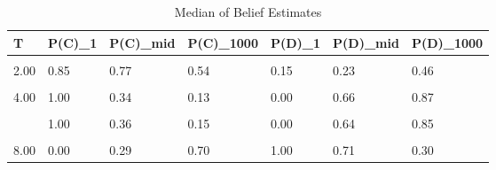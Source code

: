 \begin{table}[!h]
\centering
\caption{Median of Belief Estimates}
\centering
\begin{tabular}[t]{lllllll}
\toprule
T & P(C)\_1 & P(C)\_mid & P(C)\_1000 & P(D)\_1 & P(D)\_mid & P(D)\_1000\\
\midrule
\cellcolor{gray!10}{1.00} & \cellcolor{gray!10}{1.00} & \cellcolor{gray!10}{0.30} & \cellcolor{gray!10}{0.28} & \cellcolor{gray!10}{0.00} & \cellcolor{gray!10}{0.70} & \cellcolor{gray!10}{0.72}\\
2.00 & 0.85 & 0.77 & 0.54 & 0.15 & 0.23 & 0.46\\
\cellcolor{gray!10}{3.00} & \cellcolor{gray!10}{0.98} & \cellcolor{gray!10}{0.09} & \cellcolor{gray!10}{0.08} & \cellcolor{gray!10}{0.02} & \cellcolor{gray!10}{0.91} & \cellcolor{gray!10}{0.92}\\
4.00 & 1.00 & 0.34 & 0.13 & 0.00 & 0.66 & 0.87\\
\cellcolor{gray!10}{5.00} & \cellcolor{gray!10}{1.00} & \cellcolor{gray!10}{0.26} & \cellcolor{gray!10}{0.07} & \cellcolor{gray!10}{0.00} & \cellcolor{gray!10}{0.74} & \cellcolor{gray!10}{0.93}\\
\addlinespace
6.00 & 1.00 & 0.36 & 0.15 & 0.00 & 0.64 & 0.85\\
\cellcolor{gray!10}{7.00} & \cellcolor{gray!10}{0.02} & \cellcolor{gray!10}{0.39} & \cellcolor{gray!10}{0.83} & \cellcolor{gray!10}{0.98} & \cellcolor{gray!10}{0.61} & \cellcolor{gray!10}{0.17}\\
8.00 & 0.00 & 0.29 & 0.70 & 1.00 & 0.71 & 0.30\\
\bottomrule
\end{tabular}
\end{table}